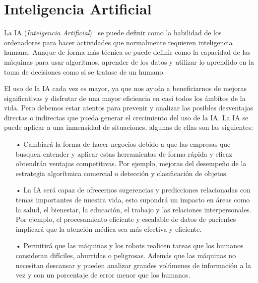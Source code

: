 \documentclass[a4paper, 12pt]{book}
\begin{document}
\section{Inteligencia Artificial} 
\label{sec:InteligenciaArtificial}

La IA (\emph{Inteigencia Artificial})~\cite{rouhiainen2018inteligencia} se puede definir como la habilidad de los ordenadores para hacer actividades que normalmente requieren inteligencia humana. Aunque de forma más técnica se puede definir como la capacidad de las máquinas para usar algoritmos, aprender de los datos y utilizar lo aprendido en la toma de decisiones como si se tratase de un humano.

El uso de la IA cada vez es mayor, ya que nos ayuda a beneficiarnos de mejoras significativas y disfrutar de una mayor eficiencia en casi todos los ámbitos de la vida. Pero debemos estar atentos para prevenir y analizar las posibles desventajas directas o indirectas que pueda generar el crecimiento del uso de la IA. La IA se puede aplicar a una inmensidad de situaciones, algunas de ellas son las siguientes:

\begin{itemize}

    \item[•] Cambiará la forma de hacer negocios debido a que las empresas que busquen entender y aplicar estas herramientas de forma rápida y eficaz obtendrán ventajas competitivas. Por ejemplo, mejoras del desempeño de la estrategia algorítmica comercial o detección y clasificación de objetos.
    
	\item[•] La IA será capaz de ofrecernos sugerencias y predicciones relacionadas con temas importantes de nuestra vida, esto supondrá un impacto en áreas como la salud, el bienestar, la educación, el trabajo y las relaciones interpersonales. Por ejemplo, el procesamiento eficiente y escalable de datos de pacientes implicará que la atención médica sea
más efectiva y eficiente. 

	\item[•] Permitirá que las máquinas y los robots realicen tareas que los humanos consideran difíciles, aburridas o peligrosas. Además que las máquinas no necesitan descansar y pueden analizar grandes volúmenes de información a la vez y con un porcentaje de error menor que los humanos.
	
\end{itemize}
\end{document}
